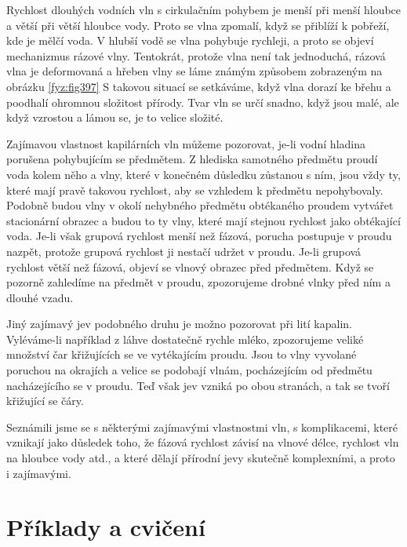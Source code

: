 {  Rychlost dlouhých vodních vln s cirkulačním pohybem je menší při menší hloubce a větší při větší 
  hloubce vody. Proto se vlna zpomalí, když se přiblíží k pobřeží, kde je mělčí voda. V hlubší vodě 
  se vlna pohybuje rychleji, a proto se objeví mechanizmus rázové vlny. Tentokrát, protože vlna 
  není tak jednoduchá, rázová vlna je deformovaná a hřeben vlny se láme známým způsobem zobrazeným 
  na obrázku \ref{fyz:fig397} S takovou situací se setkáváme, když vlna dorazí ke břehu a poodhalí 
  ohromnou složitost přírody. Tvar vln se určí snadno, když jsou malé, ale když vzrostou a lámou 
  se, je to velice složité. 
  
  Zajímavou vlastnost kapilárních vln můžeme pozorovat, je-li vodní hladina porušena pohybujícím se 
  předmětem. Z hlediska samotného předmětu proudí voda kolem něho a vlny, které v konečném důsledku 
  zůstanou s ním, jsou vždy ty, které mají pravě takovou rychlost, aby se vzhledem k předmětu 
  nepohybovaly. Podobně budou vlny v okolí nehybného předmětu obtékaného proudem vytvářet 
  stacionární obrazec a budou to ty vlny, které mají stejnou rychlost jako obtékající voda. Je-li 
  však grupová rychlost menší než fázová, porucha postupuje v proudu nazpět, protože grupová 
  rychlost ji nestačí udržet v proudu. Je-li grupová rychlost větší než fázová, objeví se vlnový 
  obrazec před předmětem. Když se pozorně zahledíme na předmět v proudu, zpozorujeme drobné vlnky 
  před ním a dlouhé vzadu. 
  
  Jiný zajímavý jev podobného druhu je možno pozorovat při lití kapalin. Vyléváme-li například z 
  láhve dostatečně rychle mléko, zpozorujeme veliké množství čar křižujících se ve vytékajícím 
  proudu. Jsou to vlny vyvolané poruchou na okrajích a velice se podobají vlnám, pocházejícím od 
  předmětu nacházejícího se v proudu. Teď však jev vzniká po obou stranách, a tak se tvoří 
  křižující se čáry. 
  
  Seznámili jsme se s některými zajímavými vlastnostmi vln, s komplikacemi, které vznikají jako 
  důsledek toho, že fázová rychlost závisí na vlnové délce, rychlost vln na hloubce vody atd., a 
  které dělají přírodní jevy skutečně komplexními, a proto i zajímavými.
  
\section{Příklady a cvičení}\label{fyz:IchapLIsecVI}
  



  
} %
\printbibliography[title={Seznam literatury}, heading=subbibliography]
